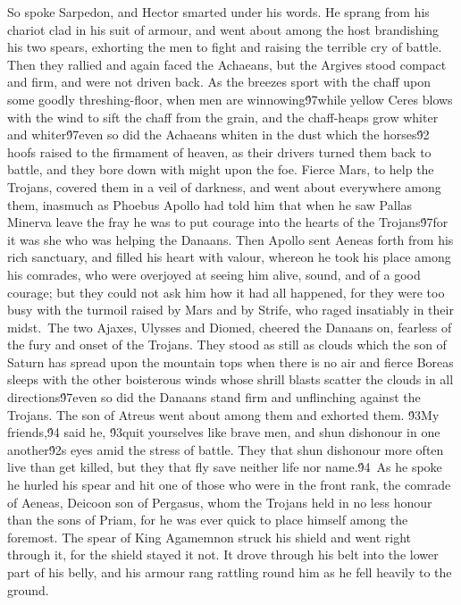 {So spoke Sarpedon, and Hector smarted under his words. He sprang from his chariot clad in his suit of armour, and went about among the host brandishing his two spears, exhorting the men to fight and raising the terrible cry of battle. Then they rallied and again faced the Achaeans, but the Argives stood compact and firm, and were not driven back. As the breezes sport with the chaff upon some goodly threshing-floor, when men are winnowing\'97while yellow Ceres blows with the wind to sift the chaff from the grain, and the chaff-heaps grow whiter and whiter\'97even so did the Achaeans whiten in the dust which the horses\'92 hoofs raised to the firmament of heaven, as their drivers turned them back to battle, and they bore down with might upon the foe. Fierce Mars, to help the Trojans, covered them in a veil of darkness, and went about everywhere among them, inasmuch as Phoebus Apollo had told him that when he saw Pallas Minerva leave the fray he was to put courage into the hearts of the Trojans\'97for it was she who was helping the Danaans. Then Apollo sent Aeneas forth from his rich sanctuary, and filled his heart with valour, whereon he took his place among his comrades, who were overjoyed at seeing him alive, sound, and of a good courage; but they could not ask him how it had all happened, for they were too busy with the turmoil raised by Mars and by Strife, who raged insatiably in their midst.\
The two Ajaxes, Ulysses and Diomed, cheered the Danaans on, fearless of the fury and onset of the Trojans. They stood as still as clouds which the son of Saturn has spread upon the mountain tops when there is no air and fierce Boreas sleeps with the other boisterous winds whose shrill blasts scatter the clouds in all directions\'97even so did the Danaans stand firm and unflinching against the Trojans. The son of Atreus went about among them and exhorted them. \'93My friends,\'94 said he, \'93quit yourselves like brave men, and shun dishonour in one another\'92s eyes amid the stress of battle. They that shun dishonour more often live than get killed, but they that fly save neither life nor name.\'94\
As he spoke he hurled his spear and hit one of those who were in the front rank, the comrade of Aeneas, Deicoon son of Pergasus, whom the Trojans held in no less honour than the sons of Priam, for he was ever quick to place himself among the foremost. The spear of King Agamemnon struck his shield and went right through it, for the shield stayed it not. It drove through his belt into the lower part of his belly, and his armour rang rattling round him as he fell heavily to the ground.\
}
